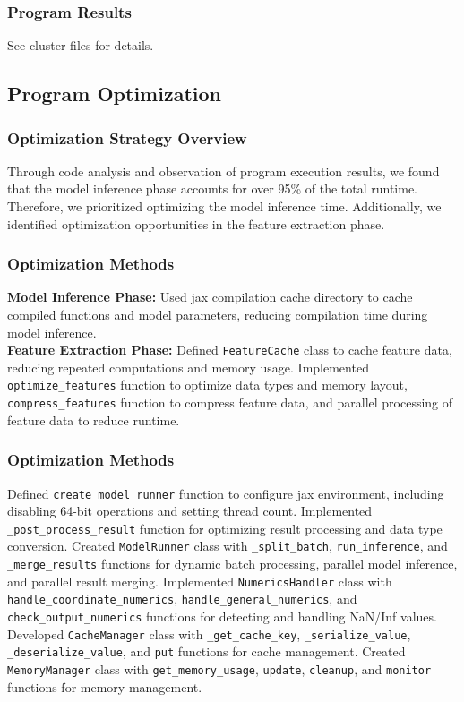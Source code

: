 \documentclass[a4paper,12pt]{article}
\begin{document}
\subsubsection{Program Results}
See cluster files for details.

\subsection{Program Optimization}

\subsubsection{Optimization Strategy Overview}
Through code analysis and observation of program execution results, we found that the model inference phase accounts for over 95\% of the total runtime. Therefore, we prioritized optimizing the model inference time. Additionally, we identified optimization opportunities in the feature extraction phase.

\subsubsection{Optimization Methods}
\textbf{Model Inference Phase:} Used jax compilation cache directory to cache compiled functions and model parameters, reducing compilation time during model inference. \\
\textbf{Feature Extraction Phase:} Defined \texttt{FeatureCache} class to cache feature data, reducing repeated computations and memory usage. Implemented \texttt{optimize\_features} function to optimize data types and memory layout, \texttt{compress\_features} function to compress feature data, and parallel processing of feature data to reduce runtime.

\subsubsection{Optimization Methods}
Defined \texttt{create\_model\_runner} function to configure jax environment, including disabling 64-bit operations and setting thread count. Implemented \texttt{\_post\_process\_result} function for optimizing result processing and data type conversion. Created \texttt{ModelRunner} class with \texttt{\_split\_batch}, \texttt{run\_inference}, and \texttt{\_merge\_results} functions for dynamic batch processing, parallel model inference, and parallel result merging. Implemented \texttt{NumericsHandler} class with \texttt{handle\_coordinate\_numerics}, \texttt{handle\_general\_numerics}, and \texttt{check\_output\_numerics} functions for detecting and handling NaN/Inf values. Developed \texttt{CacheManager} class with \texttt{\_get\_cache\_key}, \texttt{\_serialize\_value}, \texttt{\_deserialize\_value}, and \texttt{put} functions for cache management. Created \texttt{MemoryManager} class with \texttt{get\_memory\_usage}, \texttt{update}, \texttt{cleanup}, and \texttt{monitor} functions for memory management.
\end{document}
